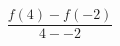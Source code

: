 \documentclass[preview]{standalone}
\begin{document}
\begin{align*}
\dfrac{f(4) - f(-2)}{4 - -2}
\end{align*}
\end{document}
